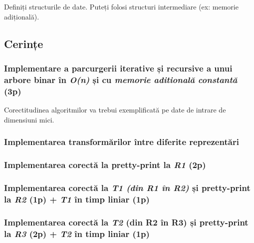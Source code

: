 \documentclass[../ro-fa-lab.tex]{subfiles}
\begin{document}
Definiți structurile de date. Puteți folosi structuri intermediare (ex:
memorie adițională).

\subsection{Cerințe}\label{cerinux21be}

\subsubsection{\texorpdfstring{Implementare a parcurgerii iterative și
recursive a unui arbore binar în \emph{O(n)} și cu \emph{memorie
aditională constantă}
(3p)}{Implementare a parcurgerii iterative și recursive a unui arbore binar în O(n) și cu memorie aditională constantă (3p)}}\label{implementare-a-parcurgerii-iterative-ux219i-recursive-a-unui-arbore-binar-uxeen-on-ux219i-cu-memorie-aditionalux103-constantux103-3p}

Corectitudinea algoritmilor va trebui exemplificată pe date de intrare
de dimensiuni mici.

\subsubsection{Implementarea transformărilor între diferite
reprezentări}\label{implementarea-transformux103rilor-uxeentre-diferite-reprezentux103ri}

\subsubsection{\texorpdfstring{Implementarea corectă la pretty-print la
\emph{R1}
(2p)}{Implementarea corectă la pretty-print la R1 (2p)}}\label{implementarea-corectux103-la-pretty-print-la-r1-2p}

\subsubsection{\texorpdfstring{Implementarea corectă la \emph{T1 (din R1 în
R2)} și pretty-print la \emph{R2} (1p) + \emph{T1} în timp liniar
(1p)}{Implementarea corectă la T1 (din R1 în R2) și pretty-print la R2 (1p) + T1 în timp liniar (1p)}}\label{implementarea-corectux103-la-t1-din-r1-uxeen-r2-ux219i-pretty-print-la-r2-1p-t1-uxeen-timp-liniar-1p}

\subsubsection{\texorpdfstring{Implementarea corectă la \emph{T2} (din R2
în R3) și pretty-print la \emph{R3} (2p) + \emph{T2} în timp liniar
(1p)}{Implementarea corectă la T2 (din R2 în R3) și pretty-print la R3 (2p) + T2 în timp liniar (1p)}}\label{implementarea-corectux103-la-t2-din-r2-uxeen-r3-ux219i-pretty-print-la-r3-2p-t2-uxeen-timp-liniar-1p}
\end{document}
